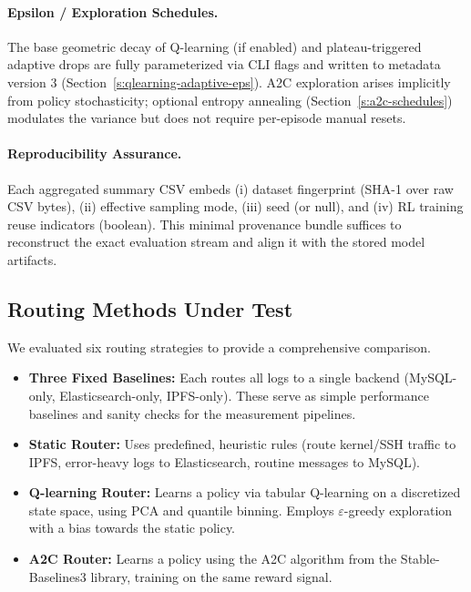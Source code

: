 \paragraph{Epsilon / Exploration Schedules.} The base geometric decay of Q-learning (if enabled) and plateau-triggered adaptive drops are fully parameterized via CLI flags and written to metadata version 3 (Section~\ref{s:qlearning-adaptive-eps}). A2C exploration arises implicitly from policy stochasticity; optional entropy annealing (Section~\ref{s:a2c-schedules}) modulates the variance but does not require per-episode manual resets.

\paragraph{Reproducibility Assurance.} Each aggregated summary CSV embeds (i) dataset fingerprint (SHA-1 over raw CSV bytes), (ii) effective sampling mode, (iii) seed (or null), and (iv) RL training reuse indicators (boolean). This minimal provenance bundle suffices to reconstruct the exact evaluation stream and align it with the stored model artifacts.

\subsection{Routing Methods Under Test}
We evaluated six routing strategies to provide a comprehensive comparison.

\begin{itemize}
    \item \textbf{Three Fixed Baselines:} Each routes all logs to a single backend (MySQL-only, Elasticsearch-only, IPFS-only). These serve as simple performance baselines and sanity checks for the measurement pipelines.
    
    \item \textbf{Static Router:} Uses predefined, heuristic rules (route kernel/SSH traffic to IPFS, error-heavy logs to Elasticsearch, routine messages to MySQL).
    
    \item \textbf{Q-learning Router:} Learns a policy via tabular Q-learning on a discretized state space, using PCA and quantile binning. Employs $\varepsilon$-greedy exploration with a bias towards the static policy.
    
    \item \textbf{A2C Router:} Learns a policy using the A2C algorithm from the Stable-Baselines3 library, training on the same reward signal.
\end{itemize}

